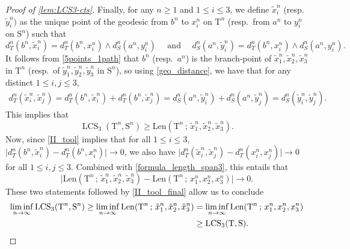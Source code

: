 \documentclass[11pt,reqno]{amsart}
\newcommand{\1}{\mathbf{1}}
\newcommand{\0}{\mathbf{0}}
\newcommand{\rT}{\mathrm{T}}
\newcommand{\rS}{\mathrm{S}}
\newcommand{\LCS}{\operatorname{LCS}}
\begin{document}
\begin{proof}[Proof of \cref{lem:LCS3-cts}]
Finally, for any $n\geq 1$ and $1\leq i\leq 3$, we define $\tilde{x}_i^n$ (resp.~$\tilde{y}_i^n)$ as the unique point of the geodesic from $b^n$ to $x_i^n$ on $\rT^n$ (resp.~from $a^n$ to $y_i^n$ on $\rS^n$) such that 
\[d_T^n(b^n,\tilde{x}_i^n)=d_T^n(b^n,x_i^n)\wedge d_S^n(a^n,y_i^n)\quad\text{ and }\quad d_S^n(a^n,\tilde{y}_i^n)=d_T^n(b^n,x_i^n)\wedge d_S^n(a^n,y_i^n).\]
It follows from \cref{5points_1path} that $b^n$ (resp.~$a^n$) is the branch-point of $\tilde{x}_1^n,\tilde{x}_2^n,\tilde{x}_3^n$ in $\rT^n$ (resp.~of $\tilde{y}_1^n,\tilde{y}_2^n,\tilde{y}_3^n$ in $\rS^n$), so using \eqref{geo_distance}, we have that for any distinct $1\leq i,j\leq 3$,
\begin{align*} d_T^n(\tilde{x}_i^n,\tilde{x}_j^n)=d_T^n(b^n,\tilde{x}_i^n)+d_T^n(b^n,\tilde{x}_j^n)=d_S^n(a^n,\tilde{y}_i^n)+d_S^n(a^n,\tilde{y}_j^n)=d_S^n(\tilde{y}_i^n,\tilde{y}_j^n).
\end{align*}
This implies that 
\[\LCS_3(\rT^n,\rS^n)\geq \mathrm{Len}(\rT^n\, ;\, \tilde{x}_1^n,\tilde{x}_2^n,\tilde{x}_3^n).\] 
Now, since \eqref{II_tool} implies that for all $1 \leq i \leq 3$, 
$\big|d_T^n(b^n,\tilde{x}_i^n)-d_T^n(b^n,x_i^n)\big|\to 0$,
we also have $\big|d_T^n(\tilde{x}_i^n,\tilde{x}_j^n)-d_T^n(x_i^n,x_j^n)\big|\to 0$ 
for all $1\leq i,j\leq 3$. Combined with \eqref{formula_length_span3}, this entails that
\[\Big|\mathrm{Len}(\rT^n\, ;\, \tilde{x}_1^n,\tilde{x}_2^n,\tilde{x}_3^n)-\mathrm{Len}(\rT^n\, ;\, x_1^n,x_2^n,x_3^n)\Big|\to 0.\]
These two statements followed by \eqref{II_tool_final} allow us to conclude
\begin{align*}
    \liminf_{n\to\infty}\LCS_3(\rT^n,\rS^n)\geq \liminf_{n\to\infty} \mathrm{Len}(\rT^n\, ;\, \tilde{x}_1^n,\tilde{x}_2^n,\tilde{x}_3^n) 
    &= \liminf_{n\to\infty} \mathrm{Len}(\rT^n\, ;\, x_1^n,x_2^n,x_3^n) \\
    &\geq \LCS_3(\rT,\rS). \qedhere
\end{align*}
\end{proof}
\end{document}
